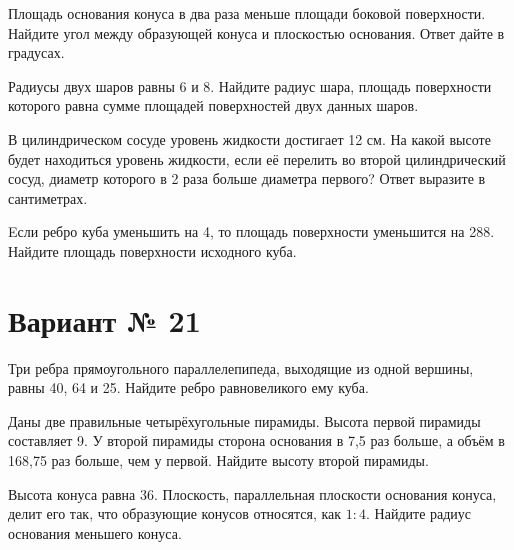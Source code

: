 \documentclass[4apaper]{article}
\begin{document}
\begin{taskBN}{3}
Площадь основания конуса в два раза меньше площади боковой поверхности. Найдите угол между образующей конуса и плоскостью основания. Ответ дайте в градусах.
\end{taskBN}

\begin{taskBN}{4}
Радиусы двух шаров равны $6$ и $8$. Найдите радиус шара, площадь поверхности которого равна сумме площадей поверхностей двух данных шаров.
\end{taskBN}

\begin{taskBN}{5}
В цилиндрическом сосуде уровень жидкости достигает 12 см. На какой высоте будет находиться уровень жидкости, если её перелить во второй цилиндрический сосуд, диаметр которого в 2 раза больше диаметра первого? Ответ выразите в сантиметрах.
\end{taskBN}

\begin{taskBN}{6}
Eсли ребро куба уменьшить на 4, то площадь поверхности уменьшится на 288. Найдите площадь поверхности исходного куба.
\end{taskBN}
\newpage\section*{Вариант № 21}

\begin{taskBN}{1}
Три ребра прямоугольного параллелепипеда, выходящие из одной вершины, равны 40, 64 и 25. Найдите ребро равновеликого ему куба.
\end{taskBN}

\begin{taskBN}{2}
Даны две правильные четырёхугольные пирамиды. Высота первой пирамиды составляет 9. У второй пирамиды сторона основания в 7,5 раз больше, а объём в 168,75 раз больше, чем у первой. Найдите высоту второй пирамиды.
\end{taskBN}

\begin{taskBN}{3}
Высота конуса равна $36$. Плоскость, параллельная плоскости основания конуса,  делит его так, что образующие конусов относятся, как $1:4$. Найдите радиус основания меньшего конуса. 
\end{taskBN}
\end{document}
